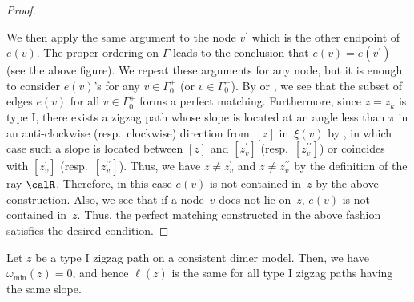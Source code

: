 \begin{proof}
\begin{center}
{{
} }
\end{center}

We then apply the same argument to the node $v^\prime$ which is the other endpoint of $e(v)$.
The proper ordering on $\Gamma$ leads to the conclusion that $e(v)=e(v^\prime)$ (see the above figure).
We repeat these arguments for any node, but it is enough to consider $e(v)$'s for any $v\in\Gamma^+_0$ (or $v\in\Gamma^-_0$).
By \cite[Section~3.2]{Gul} or \cite[Lemma~4.19]{Bro}, we see that the subset of edges $e(v)$ for all $v\in\Gamma^+_0$ forms a perfect matching.
Furthermore, since $z=z_k$ is type I, there exists a zigzag path whose slope is located at an angle less than $\pi$ in an anti-clockwise (resp.\ clockwise) direction from~$[z]$ in~$\xi(v)$ by \cite[Lemma~4.11 and its proof]{Bro}, in which case such a slope is located between $[z]$ and $[z^\prime_v]$ (resp.~$[z^{\prime\prime}_v]$) or coincides with $[z^\prime_v]$ (resp.~$[z^{\prime\prime}_v]$). Thus, we have $z\neq z^\prime_v$ and $z\neq z^{\prime\prime}_v$ by the definition of the ray $\calR$.
Therefore, in this case $e(v)$ is not contained in~$z$ by the above construction.
Also, we see that if a node~$v$ does not lie on~$z$, $e(v)$ is not contained in~$z$.
Thus, the perfect matching constructed in the above fashion satisfies the desired condition.
\end{proof}

\begin{Lemma}\label{lem_same_length}
Let $z$ be a type I zigzag path on a consistent dimer model.
Then, we have $\omega_{\min}(z)=0$, and hence $\ell(z)$ is the same for all type I zigzag paths having the same slope.
\end{Lemma}

